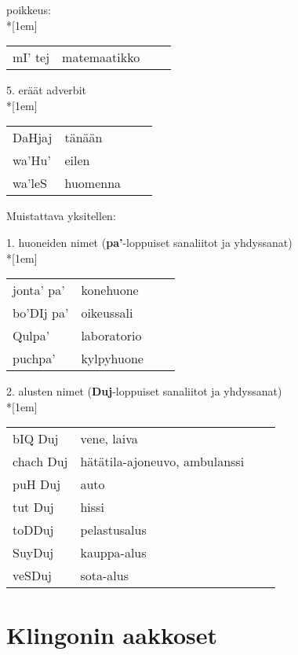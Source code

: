 \documentclass{book}
\begin{document}
poikkeus:\\*[1em]
\begin{tabular}{Bl Il}
    mI' tej & matemaatikko \\
\end{tabular}

5. eräät adverbit\\*[1em]
\begin{tabular}{Bl Il}
    DaHjaj  & tänään \\
    wa'Hu' & eilen \\
    wa'leS & huomenna \\
\end{tabular}

Muistattava yksitellen:

1. huoneiden nimet (\textbf{pa'}-loppuiset sanaliitot ja yhdyssanat)\\*[1em]
\begin{tabular}{Bl Il}
    jonta' pa' & konehuone \\
    bo'DIj pa' & oikeussali \\
    Qulpa' & laboratorio \\
    puchpa' & kylpyhuone \\
\end{tabular}

2. alusten nimet (\textbf{Duj}-loppuiset sanaliitot ja yhdyssanat)\\*[1em]
\begin{tabular}{Bl Il}
    bIQ Duj & vene, laiva \\
    chach Duj & hätätila-ajoneuvo, ambulanssi \\
    puH Duj & auto \\
    tut Duj & hissi \\
    toDDuj & pelastusalus \\
    SuyDuj & kauppa-alus \\
    veSDuj & sota-alus \\
\end{tabular}

\appendix
\chapter{Klingonin aakkoset}
\end{document}
